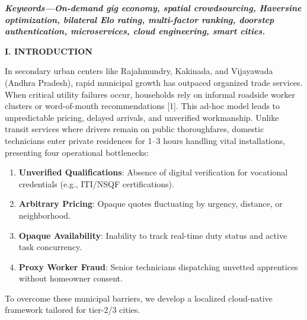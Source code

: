 \documentclass[10pt,twocolumn,a4paper]{article}
\begin{document}
\vspace{0.25em}
\noindent
\textbf{\textit{Keywords---On-demand gig economy, spatial crowdsourcing, Haversine optimization, bilateral Elo rating, multi-factor ranking, doorstep authentication, microservices, cloud engineering, smart cities.}}

\vspace{0.35em}

\noindent
\textbf{\large I. INTRODUCTION}

\vspace{0.2em}
In secondary urban centers like Rajahmundry, Kakinada, and Vijayawada (Andhra Pradesh), rapid municipal growth has outpaced organized trade services. When critical utility failures occur, households rely on informal roadside worker clusters or word-of-mouth recommendations [1]. This ad-hoc model leads to unpredictable pricing, delayed arrivals, and unverified workmanship. Unlike transit services where drivers remain on public thoroughfares, domestic technicians enter private residences for 1--3 hours handling vital installations, presenting four operational bottlenecks:
\begin{enumerate}
    \item \textbf{Unverified Qualifications}: Absence of digital verification for vocational credentials (e.g., ITI/NSQF certifications).
    \item \textbf{Arbitrary Pricing}: Opaque quotes fluctuating by urgency, distance, or neighborhood.
    \item \textbf{Opaque Availability}: Inability to track real-time duty status and active task concurrency.
    \item \textbf{Proxy Worker Fraud}: Senior technicians dispatching unvetted apprentices without homeowner consent.
\end{enumerate}

To overcome these municipal barriers, we develop a localized cloud-native framework tailored for tier-2/3 cities.
\end{document}
